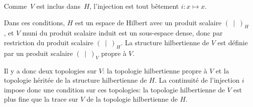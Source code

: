 \medskip
Comme~$V$ est inclus dans~$H$, l'injection est tout bêtement $i: x\mapsto x$.

\medskip
Dans ces conditions, $H$ est un espace de Hilbert avec un produit scalaire $(\ \mid\ )_H$, et $V$ muni du produit scalaire induit est un sous-espace dense, donc  par restriction du produit scalaire $(\ \mid\ )_H$.
La structure hilbertienne de $V$ est définie par un produit scalaire $(\ \mid\ )_V$ propre à $V$.

\medskip
Il y a donc deux topologies sur $V$: la topologie hilbertienne propre à $V$ et la topologie héritée de la structure hilbertienne de $H$.
La continuité de l'injection $i$ impose donc une condition sur ces topologies: la topologie hilbertienne de $V$ est plus fine que la trace sur $V$ de la topologie hilbertienne de $H$.

\medskip
{} 
